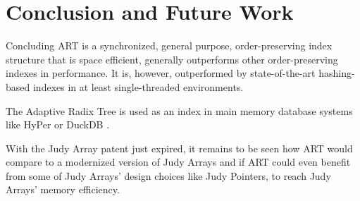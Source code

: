 \documentclass[acmtog, nonacm]{acmart}
\begin{document}
\section{Conclusion and Future Work}

Concluding ART is a synchronized, general purpose, order-preserving index structure that is space efficient, 
generally outperforms other order-preserving indexes in performance.
It is, however, outperformed by state-of-the-art hashing-based indexes in at least single-threaded environments.

The Adaptive Radix Tree is used as an index in main memory database systems like HyPer \cite{5767867} or DuckDB \cite{10.1145/3299869.3320212}.

With the Judy Array patent just expired, it remains to be seen how ART would compare to a modernized version of
Judy Arrays and if ART could even benefit from some of Judy Arrays' design choices like Judy Pointers, to reach 
Judy Arrays' memory efficiency.



\end{document}

